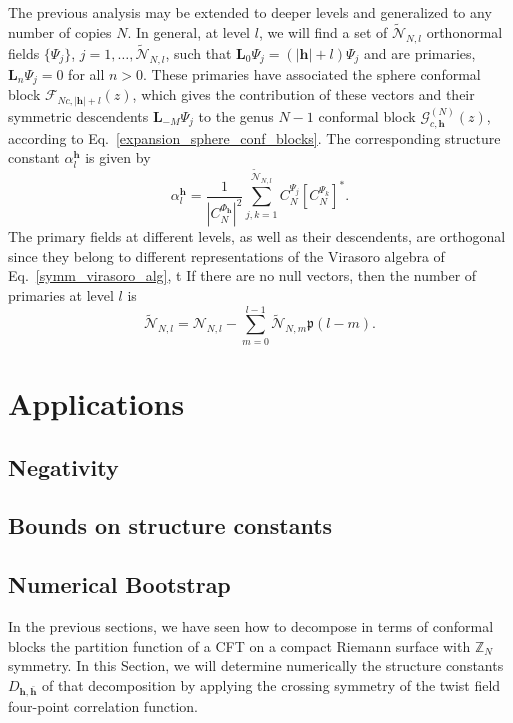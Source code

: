 \documentclass[a4paper,11pt]{article}
\begin{document}
The previous analysis may be extended to deeper levels and generalized to
any number of copies $N$. In general, at level $l$, we will find a set of 
$\tilde{\mathcal{N}}_{N,l}$ orthonormal fields $\{\Psi_j\}$, $j=1,\dots, \tilde{\mathcal{N}}_{N,l}$,
such that $\boldsymbol{L}_0\Psi_j=(|\boldsymbol{h}|+l)\Psi_j$ and are primaries,
$\boldsymbol{L}_n\Psi_j=0$ for all $n>0$. These primaries have associated the 
sphere conformal block $\mathcal{F}_{Nc, |\boldsymbol{h}|+l}(z)$, which gives the 
contribution of these vectors and their symmetric descendents $\boldsymbol{L}_{-M}\Psi_j$
to the genus $N-1$ conformal block $\mathcal{G}_{c, \boldsymbol{h}}^{(N)}(z)$, 
according to Eq.~\eqref{expansion_sphere_conf_blocks}. The corresponding structure constant $\alpha_l^{\boldsymbol{h}}$
is given by
\begin{equation}
 \alpha_l^{\boldsymbol{h}}=\frac{1}{|C_N^{\Phi_{\boldsymbol{h}}}|^2}\sum_{j, k=1}^{\tilde{\mathcal{N}}_{N,l}}
 C_N^{\Psi_{j}}\left[C_N^{\Psi_{k}}\right]^*.
\end{equation}
The primary fields at 
different levels, as well as their descendents, are orthogonal
since they belong to different representations of the Virasoro algebra of Eq.~\eqref{symm_virasoro_alg}, t
If there are no null vectors, then the number of primaries at level $l$ is
\begin{equation}
 \tilde{\mathcal{N}}_{N, l}=\mathcal{N}_{N, l}
 -\sum_{m=0}^{l-1}\tilde{\mathcal{N}}_{N, m}\mathfrak{p}(l-m).
\end{equation}
\section{Applications}\label{sec:num_bootstrap}

\subsection{Negativity}

\subsection{Bounds on structure constants}

\subsection{Numerical Bootstrap}
In the previous sections, we have seen how to decompose in terms of conformal blocks 
the partition function of a CFT on a compact Riemann surface with $\mathbb{Z}_N$ symmetry. 
In this Section, we will determine numerically the structure constants $D_{\boldsymbol{h}, \boldsymbol{\bar{h}}}$
of that decomposition by applying the crossing symmetry of the twist field four-point 
correlation function.
\end{document}
